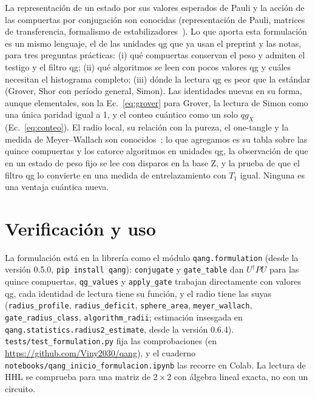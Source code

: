 \documentclass[11pt]{article}
\newcommand{\qX}{qg_X}
\begin{document}
La representación de un estado por sus valores esperados de Pauli y la acción de las compuertas por
conjugación son conocidas (representación de Pauli, matrices de transferencia, formalismo de
estabilizadores~\cite{nielsen2010quantum}). Lo que aporta esta formulación es un mismo lenguaje, el de las
unidades qg que ya usan el preprint y las notas, para tres preguntas prácticas:
(i) qué compuertas conservan el peso y admiten el testigo y el filtro qg;
(ii) qué algoritmos se leen con pocos valores qg y cuáles necesitan el histograma completo;
(iii) dónde la lectura qg es peor que la estándar (Grover, Shor con período general, Simon).
Las identidades nuevas en su forma, aunque elementales, son la Ec.~\eqref{eq:grover} para Grover, la lectura
de Simon como una única paridad igual a 1, y el conteo cuántico como un solo $\qX$ (Ec.~\eqref{eq:conteo}).
El radio local, su relación con la pureza, el one-tangle y la medida de Meyer--Wallach son
conocidos~\cite{wootters1998,coffman2000,meyer2002,brennen2003}; lo que agregamos es su tabla sobre las quince
compuertas y los catorce algoritmos en unidades qg, la observación de que en un estado de peso fijo se lee con
disparos en la base Z, y la prueba de que el filtro qg lo convierte en una medida de entrelazamiento con $T_1$ igual.
Ninguna es una ventaja cuántica nueva.

\section{Verificación y uso}
La formulación está en la librería como el módulo \texttt{qang.formulation} (desde la versión 0.5.0,
\texttt{pip install qang}): \texttt{conjugate} y \texttt{gate\_table} dan $U^\dagger PU$ para las quince
compuertas, \texttt{qg\_values} y \texttt{apply\_gate} trabajan directamente con valores qg, cada
identidad de lectura tiene su función, y el radio tiene las suyas (\texttt{radius\_profile}, \texttt{radius\_deficit},
\texttt{sphere\_area}, \texttt{meyer\_wallach}, \texttt{gate\_radius\_class}, \texttt{algorithm\_radii}; estimación
insesgada en \texttt{qang.statistics.radius2\_estimate}, desde la versión 0.6.4). \texttt{tests/test\_formulation.py} fija las comprobaciones (en
\url{https://github.com/Viny2030/qang}), y el cuaderno \texttt{notebooks/qang\_inicio\_formulacion.ipynb}
las recorre en Colab. La lectura de HHL se comprueba para una matriz de $2\times2$ con álgebra lineal exacta,
no con un circuito.



\end{document}
